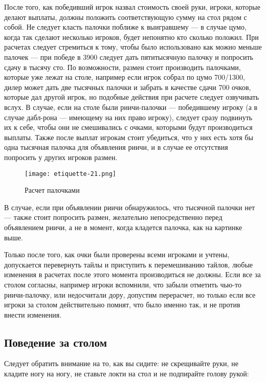 После того, как победивший игрок назвал стоимость своей руки, игроки, которые делают выплаты, должны положить соответствующую сумму на стол рядом с собой. Не следует класть палочки поближе к выигравшему --- в случае цумо, когда так сделают несколько игроков, будет непонятно кто сколько положил. При расчетах следует стремиться к тому, чтобы было использовано как можно меньше палочек --- при победе в 3900 следует дать пятитысячную палочку и попросить сдачу в тысячу сто. По возможности, размен стоит производить палочками, которые уже лежат на столе, например если игрок собрал по цумо 700/1300, дилер может дать две тысячных палочки и забрать в качестве сдачи 700 очков, которые дал другой игрок, но подобные действия при расчете следует озвучивать вслух. В случае, если на столе были риичи-палочки --- победившему игроку (а в случае дабл-рона --- имеющему на них право игроку), следует сразу подвинуть их к себе, чтобы они не смешивались с очками, которыми будут производиться выплаты. Также после выплат игрокам стоит убедиться, что у них есть хотя бы одна тысячная палочка для объявления риичи, и в случае ее отсутствия попросить у других игроков размен.

\begin{figure}[H]
	\centering
	\texttt{[image: etiquette-21.png]}
	\caption{Расчет палочками}
\end{figure}

В случае, если при объявлении риичи обнаружилось, что тысячной палочки нет --- также стоит попросить размен, желательно непосредственно перед объявлением риичи, а не в момент, когда кладется палочка, как на картинке выше.

Только после того, как очки были проверены всеми игроками и учтены, допускается перевернуть тайлы и приступить к перемешиванию тайлов, любые изменения в расчетах после этого момента производиться не должны. Если все за столом согласны, например игроки вспомнили, что забыли отметить чью-то риичи-палочку, или недосчитали дору, допустим перерасчет, но только если все игроки за столом действительно помнят, что было именно так, и не против внести изменения.

\subsection{Поведение за столом}

Следует обратить внимание на то, как вы сидите: не скрещивайте руки, не кладите ногу на ногу, не ставьте локти на стол и не подпирайте голову рукой:

